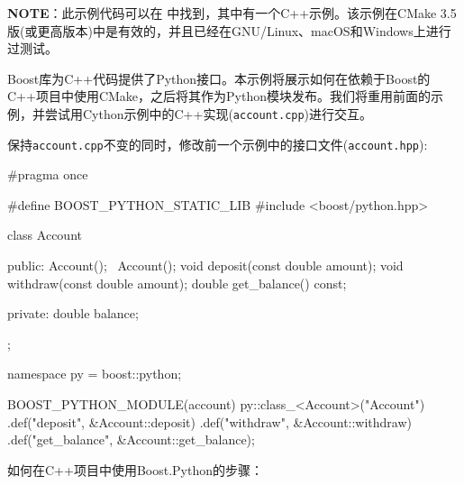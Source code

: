 \begin{myInfoBox}
\textbf{NOTE}：此示例代码可以在  中找到，其中有一个C++示例。该示例在CMake 3.5版(或更高版本)中是有效的，并且已经在GNU/Linux、macOS和Windows上进行过测试。
\end{myInfoBox}

Boost库为C++代码提供了Python接口。本示例将展示如何在依赖于Boost的C++项目中使用CMake，之后将其作为Python模块发布。我们将重用前面的示例，并尝试用Cython示例中的C++实现(\texttt{account.cpp})进行交互。


保持\texttt{account.cpp}不变的同时，修改前一个示例中的接口文件(\texttt{account.hpp}):

\begin{codebox}[cpp]
#pragma once

#define BOOST_PYTHON_STATIC_LIB
#include <boost/python.hpp>

class Account
{
public:
  Account();
  ~Account();
  void deposit(const double amount);
  void withdraw(const double amount);
  double get_balance() const;

private:
  double balance;
};

namespace py = boost::python;

BOOST_PYTHON_MODULE(account)
{
  py::class_<Account>("Account")
      .def("deposit", &Account::deposit)
      .def("withdraw", &Account::withdraw)
      .def("get_balance", &Account::get_balance);
}
\end{codebox}


如何在C++项目中使用Boost.Python的步骤：


